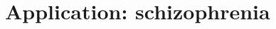 \documentclass[../main.tex]{subfiles}
\begin{document}
\chapter{Application: schizophrenia}
\end{document}
